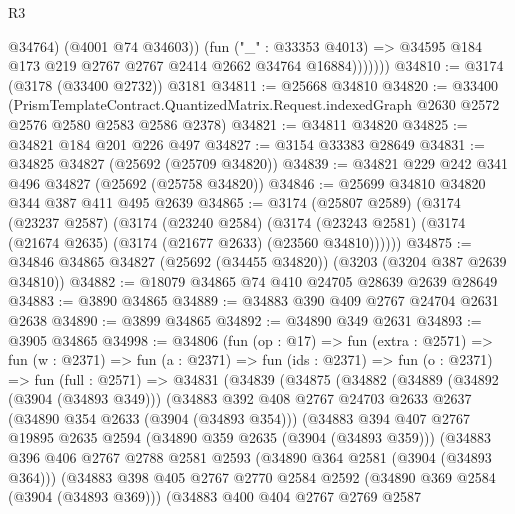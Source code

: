 \begin{lexlean}{R3}
\begin{coremodule}
                    @34764)
                  (@4001 @74 @34603))
                (fun ("_" : @33353 @4013) =>
                @34595 @184 @173 @219 @2767 @2767 @2414 @2662 @34764 @16884)))))))
@34810 := @3174 (@3178 (@33400 @2732)) @3181
@34811 := @25668 @34810
@34820 := @33400
    (PrismTemplateContract.QuantizedMatrix.Request.indexedGraph
      @2630
      @2572
      @2576
      @2580
      @2583
      @2586
      @2378)
@34821 := @34811 @34820
@34825 := @34821 @184 @201 @226 @497
@34827 := @3154 @33383 @28649
@34831 := @34825 @34827 (@25692 (@25709 @34820))
@34839 := @34821 @229 @242 @341 @496 @34827 (@25692 (@25758 @34820))
@34846 := @25699 @34810 @34820 @344 @387 @411 @495 @2639
@34865 := @3174
    (@25807 @2589)
    (@3174
      (@23237 @2587)
      (@3174
        (@23240 @2584)
        (@3174 (@23243 @2581) (@3174 (@21674 @2635) (@3174 (@21677 @2633) (@23560 @34810))))))
@34875 := @34846 @34865 @34827 (@25692 (@34455 @34820)) (@3203 (@3204 @387 @2639 @34810))
@34882 := @18079 @34865 @74 @410 @24705 @28639 @2639 @28649
@34883 := @3890 @34865
@34889 := @34883 @390 @409 @2767 @24704 @2631 @2638
@34890 := @3899 @34865
@34892 := @34890 @349 @2631
@34893 := @3905 @34865
@34998 := @34806
    (fun (op : @17) =>
    fun (extra : @2571) =>
    fun (w : @2371) =>
    fun (a : @2371) =>
    fun (ids : @2371) =>
    fun (o : @2371) =>
    fun (full : @2571) =>
    @34831
      (@34839
        (@34875
          (@34882
            (@34889
              (@34892 (@3904 (@34893 @349)))
              (@34883
                @392
                @408
                @2767
                @24703
                @2633
                @2637
                (@34890 @354 @2633 (@3904 (@34893 @354)))
                (@34883
                  @394
                  @407
                  @2767
                  @19895
                  @2635
                  @2594
                  (@34890 @359 @2635 (@3904 (@34893 @359)))
                  (@34883
                    @396
                    @406
                    @2767
                    @2788
                    @2581
                    @2593
                    (@34890 @364 @2581 (@3904 (@34893 @364)))
                    (@34883
                      @398
                      @405
                      @2767
                      @2770
                      @2584
                      @2592
                      (@34890 @369 @2584 (@3904 (@34893 @369)))
                      (@34883
                        @400
                        @404
                        @2767
                        @2769
                        @2587

\end{coremodule}
\end{lexlean}
